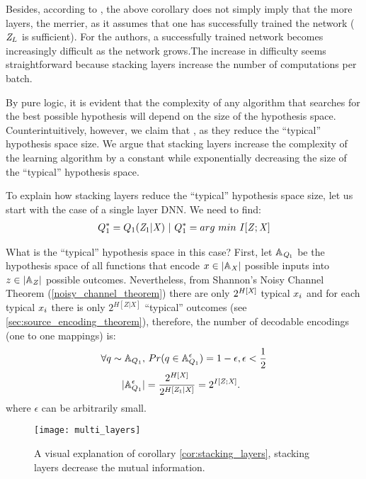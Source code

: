 Besides, according to \cite{achille:2017emergence}, the above corollary does not simply imply that the more layers, the merrier, as it assumes that one has successfully trained the network (${\mathit{Z}}_L$ is sufficient). For the authors, a successfully trained network becomes increasingly difficult as the network grows.The increase in difficulty seems straightforward because stacking layers increase the number of computations per batch.

By pure logic, it is evident that the complexity of any algorithm that searches for the best possible hypothesis will depend on the size of the hypothesis space. Counterintuitively, however, we claim that , as they reduce the ``typical'' hypothesis space size. We argue that stacking layers increase the complexity of the learning algorithm by a constant while exponentially decreasing the size of the ``typical'' hypothesis space.

To explain how stacking layers reduce the ``typical'' hypothesis space size, let us start with the case of a single layer DNN. We need to find:
\begin{align}
	Q_1^* = Q_1({\mathit{Z}}_1|{\mathit{X}})~|~Q_1^* = arg\ min\ I[{{\mathit{Z}}};{{\mathit{X}}}]
\end{align}

What is the ``typical'' hypothesis space in this case? First, let ${\mathbb{A}}_{{\mathit{Q}}_1}$ be the hypothesis space of all functions that encode ${x} \in |{\mathbb{A}}_{{\mathit{X}}}|$ possible inputs into ${z} \in |{\mathbb{A}}_{{\mathit{Z}}}|$ possible outcomes. Nevertheless, from Shannon's Noisy Channel Theorem (\cref{noisy_channel_theorem}) there are only $2^{H[{\mathit{X}}]}$ typical ${x}_i$ and for each typical ${x}_i$ there is only $2^{H[Z|X]}$ ``typical'' outcomes (see \cref{sec:source_encoding_theorem}), therefore, the number of decodable encodings (one to one mappings) is:
\begin{align}
\forall q \sim {\mathbb{A}}_{Q_1},&~Pr(q \in {\mathbb{A}}_{Q_1}^\epsilon) = 1 -\epsilon, \epsilon < \dfrac{1}{2}\\
|{\mathbb{A}}_{Q_1}^\epsilon| &= \frac{2^{H[{\mathit{X}}]}}{2^{H[{\mathit{Z}}_1|{\mathit{X}}]}}=2^{I[{{\mathit{Z}}};{{\mathit{X}}}]}.
\end{align}
where $\epsilon$ can be arbitrarily small.
\begin{figure}
	[ht!] \centering
	\texttt{[image: multi\_layers]}
	\caption{A visual explanation of corollary \ref{cor:stacking_layers}, stacking layers decrease the mutual information.}\label{fig:stacking_layers}
\end{figure}

